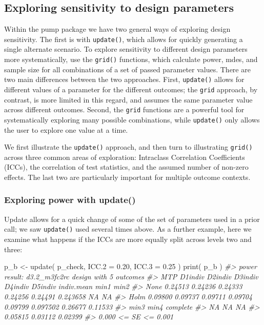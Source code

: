 \documentclass{article}
\newenvironment{Shaded}{\begin{snugshade}}{\end{snugshade}}
\newcommand{\AttributeTok}[1]{\textcolor[rgb]{0.77,0.63,0.00}{#1}}
\newcommand{\CommentTok}[1]{\textcolor[rgb]{0.56,0.35,0.01}{\textit{#1}}}
\newcommand{\FloatTok}[1]{\textcolor[rgb]{0.00,0.00,0.81}{#1}}
\newcommand{\FunctionTok}[1]{\textcolor[rgb]{0.00,0.00,0.00}{#1}}
\newcommand{\NormalTok}[1]{#1}
\newcommand{\OtherTok}[1]{\textcolor[rgb]{0.56,0.35,0.01}{#1}}
\begin{document}
\subsection{Exploring sensitivity to design parameters}

Within the pump package we have two general ways of exploring design
sensitivity. The first is with \texttt{update()}, which allows for
quickly generating a single alternate scenario. To explore sensitivity
to different design parameters more systematically, use the
\texttt{grid()} functions, which calculate power, mdes, and sample size
for all combinations of a set of passed parameter values. There are two
main differences between the two approaches. First, \texttt{update()}
allows for different values of a parameter for the different outcomes;
the \texttt{grid} approach, by contrast, is more limited in this regard,
and assumes the same parameter value across different outcomes. Second,
the \texttt{grid} functions are a powerful tool for systematically
exploring many possible combinations, while \texttt{update()} only
allows the user to explore one value at a time.

We first illustrate the \texttt{update()} approach, and then turn to
illustrating \texttt{grid()} across three common areas of exploration:
Intraclass Correlation Coefficients (ICCs), the correlation of test
statistics, and the assumed number of non-zero effects. The last two are
particularly important for multiple outcome contexts.

\subsubsection{Exploring power with update()}

Update allows for a quick change of some of the set of parameters used
in a prior call; we saw \texttt{update()} used several times above. As a
further example, here we examine what happens if the ICCs are more
equally split across levels two and three:

\begin{Shaded}
\begin{Highlighting}[]
\NormalTok{p\_b }\OtherTok{\textless{}{-}} \FunctionTok{update}\NormalTok{( p\_check, }\AttributeTok{ICC.2 =} \FloatTok{0.20}\NormalTok{, }\AttributeTok{ICC.3 =} \FloatTok{0.25}\NormalTok{ )}
\FunctionTok{print}\NormalTok{( p\_b )}
\CommentTok{\#\textgreater{} power result: d3.2\_m3fc2rc design with 5 outcomes}
\CommentTok{\#\textgreater{}   MTP D1indiv D2indiv D3indiv D4indiv D5indiv indiv.mean    min1    min2}
\CommentTok{\#\textgreater{}  None 0.24513 0.24236 0.24333 0.24256 0.24491   0.243658      NA      NA}
\CommentTok{\#\textgreater{}  Holm 0.09800 0.09737 0.09711 0.09704 0.09799   0.097502 0.26677 0.11533}
\CommentTok{\#\textgreater{}     min3    min4 complete}
\CommentTok{\#\textgreater{}       NA      NA       NA}
\CommentTok{\#\textgreater{}  0.05815 0.03112  0.02399}
\CommentTok{\#\textgreater{}  0.000 \textless{}= SE \textless{}= 0.001}
\end{Highlighting}
\end{Shaded}
\end{document}

